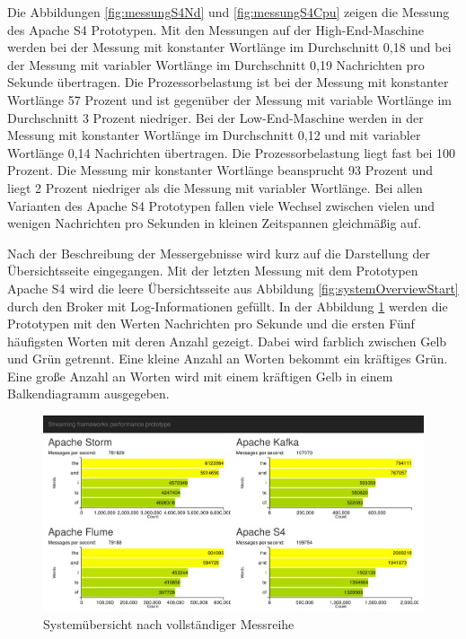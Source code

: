 Die Abbildungen \ref{fig:messungS4Nd} und \ref{fig:messungS4Cpu} zeigen die Messung des Apache S4 Prototypen. Mit den Messungen auf der High-End-Maschine werden bei der Messung mit konstanter Wortlänge im Durchschnitt 0,18 und bei der Messung mit variabler Wortlänge im Durchschnitt 0,19 Nachrichten pro Sekunde übertragen. Die Prozessorbelastung ist bei der Messung mit konstanter Wortlänge 57 Prozent und ist gegenüber der Messung mit variable Wortlänge im Durchschnitt 3 Prozent niedriger. Bei der Low-End-Maschine werden in der Messung mit konstanter Wortlänge im Durchschnitt 0,12 und mit variabler Wortlänge 0,14 Nachrichten übertragen. Die Prozessorbelastung liegt fast bei 100 Prozent. Die Messung mir konstanter Wortlänge beansprucht 93 Prozent und liegt 2 Prozent niedriger als die Messung mit variabler Wortlänge. Bei allen Varianten des Apache S4 Prototypen fallen viele Wechsel zwischen vielen und wenigen Nachrichten pro Sekunden in kleinen Zeitspannen gleichmäßig auf.

Nach der Beschreibung der Messergebnisse wird kurz auf die Darstellung der Übersichtsseite eingegangen. Mit der letzten Messung mit dem Prototypen Apache S4 wird die leere Übersichtsseite aus Abbildung \ref{fig:systemOverviewStart} durch den Broker mit Log-Informationen gefüllt. In der Abbildung \ref{fig:prototypeStreamingGraph} werden die Prototypen mit den Werten Nachrichten pro Sekunde und die ersten Fünf häufigsten Worten mit deren Anzahl gezeigt. Dabei wird farblich zwischen Gelb und Grün getrennt. Eine kleine Anzahl an Worten bekommt ein kräftiges Grün. Eine große Anzahl an Worten wird mit einem kräftigen Gelb in einem Balkendiagramm ausgegeben.


\begin{figure}[!ht]
\centering
\includegraphics[width=1.0\textwidth]{bilder/PrototypeStreamingGraph.png}
\caption{Systemübersicht nach vollständiger Messreihe
\label{fig:prototypeStreamingGraph}}
\end{figure}


